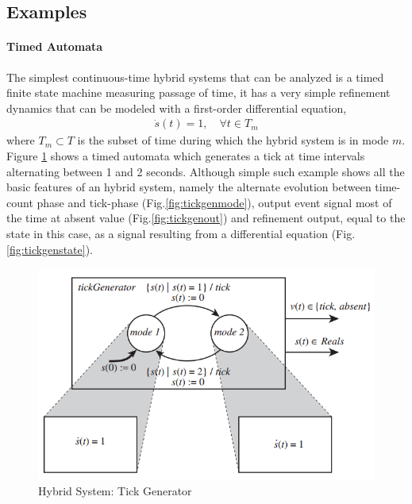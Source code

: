 \subsection{Examples}

\paragraph{Timed Automata} The simplest continuous-time hybrid systems that can be analyzed is a timed finite state machine measuring passage of time, it has a very simple refinement dynamics that can be modeled with a first-order differential equation,
\begin{align*}
\dot{s}(t)=1, \quad \forall t \in T_m
\end{align*}
where $T_m \subset T$ is the subset of time during which the hybrid system is in mode $m$. Figure \ref{fig:tickgen} shows a timed automata which generates a tick at time intervals alternating between 1 and 2 seconds. Although simple such example shows all the basic features of an hybrid system, namely the alternate evolution between time-count phase and tick-phase (Fig.\ref{fig:tickgenmode}), output event signal most of the time at absent value (Fig.\ref{fig:tickgenout}) and refinement output, equal to the state in this case, as a signal resulting from a differential equation (Fig.\ref{fig:tickgenstate}).
\begin{figure}[!ht]
	\centering 
     \includegraphics[width=.7\textwidth]{Figs/tickgen.PNG} 
     \caption{Hybrid System: Tick Generator} 
     \label{fig:tickgen} 
\end{figure}

